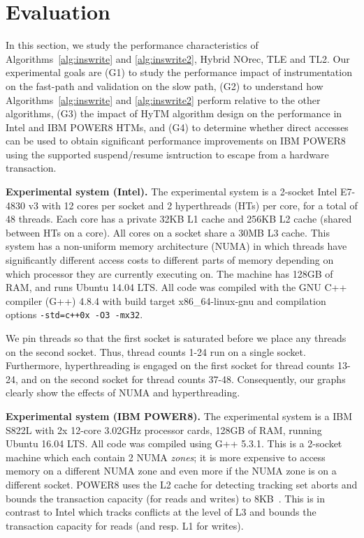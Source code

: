 \section{Evaluation}
\label{sec:eval}
%
In this section, we study the performance characteristics of Algorithms~\ref{alg:inswrite} and \ref{alg:inswrite2}, Hybrid NOrec, TLE and TL2.
Our experimental goals are (G1) to study the performance impact of instrumentation on the fast-path and validation on the slow path, 
(G2) to understand how Algorithms~\ref{alg:inswrite} and \ref{alg:inswrite2} perform relative to the other algorithms,
(G3) the impact of HyTM algorithm design on the performance in Intel and IBM POWER8 HTMs, and 
(G4) to determine whether direct accesses can be used to obtain significant performance improvements on IBM POWER8 using the supported suspend/resume isntruction to escape from a hardware transaction.

\vspace{1mm}\noindent\textbf{Experimental system (Intel).}
The experimental system is a 2-socket Intel E7-4830 v3 with 12 cores per socket and 2 hyperthreads (HTs) per core, for a total of 48 threads.
Each core has a private 32KB L1 cache and 256KB L2 cache (shared between HTs on a core).
All cores on a socket share a 30MB L3 cache.
This system has a non-uniform memory architecture (NUMA) in which threads have significantly different access costs to different parts of memory depending on which processor they are currently executing on.
The machine has 128GB of RAM, and runs Ubuntu 14.04 LTS.
All code was compiled with the GNU C++ compiler (G++) 4.8.4 with build target x86\_64-linux-gnu and compilation options \texttt{-std=c++0x -O3 -mx32}.

We pin threads so that the first socket is saturated before we place any threads on the second socket.
Thus, thread counts 1-24 run on a single socket.
Furthermore, hyperthreading is engaged on the first socket for thread counts 13-24, and on the second socket for thread counts 37-48.
Consequently, our graphs clearly show the effects of NUMA and hyperthreading.

\vspace{1mm}\noindent\textbf{Experimental system (IBM POWER8).}
The experimental system is a IBM S822L with 2x 12-core 3.02GHz processor cards, 128GB of RAM, running Ubuntu 16.04 LTS.
All code was compiled using G++ 5.3.1. This is a 2-socket machine which each contain 2 NUMA \emph{zones}; it is more expensive to access memory on a different NUMA zone and even more if the NUMA zone is on a different 
socket. POWER8 uses the L2 cache for detecting tracking set aborts and bounds the transaction capacity (for reads and writes) to 8KB~\cite{htm-survey}.
This is in contrast to Intel which tracks conflicts at the level of L3 and bounds the transaction capacity for reads (and resp. L1 for writes).


